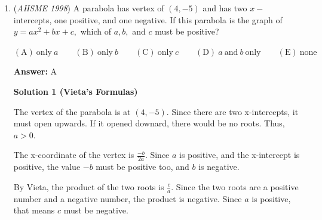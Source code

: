 \begin{enumerate}
 $\mathrm{(A) \ }14 \qquad \mathrm{(B) \ }15 \qquad \mathrm{(C) \ }16 \qquad \mathrm{(D) \ }17 \qquad \mathrm{(E) \ }18$

 \textbf{Answer: }E



\textbf{Solution}

We have $144 = 2^4 3^2$.

 As the numbers on the dice are less than $9$, the two $3$s must come from different dice. This leaves us with three cases: $(6,6,a,b)$, $(6,3,a,b)$, and $(3,3,a,b)$.

 In the first case we have $ab=2^2$, leading to the solutions $(6,6,4,1)$ and $(6,6,2,2)$.

 In the second case we have $ab=2^3$, leading to the only solution $(6,3,4,2)$.

 In the third case we have $ab=2^4$, leading to the only solution $(3,3,4,4)$.

 We found all four possibilities for the numbers on the upper faces of the dice. The sums of these numbers are $17$, $16$, $15$, and $14$.Therefore the answer is $\mathrm{(E)}$.

 


	\item (\textit{AHSME 1998}) A parabola has vertex of $(4,-5)$ and has two $x-$intercepts, one positive, and one negative. If this parabola is the graph of $y = ax^2 + bx + c,$ which of $a,b,$ and $c$ must be positive?


 $\mathrm{(A) \ } \text{only}\ a \qquad \mathrm{(B) \ } \text{only}\ b \qquad \mathrm{(C) \ } \text{only}\ c \qquad \mathrm{(D) \ } a\ \text{and}\ b\ \text{only} \qquad \mathrm{(E) \ } \text{none}$

 \textbf{Answer: }A



\textbf{Solution 1 (Vieta's Formulas)}

The vertex of the parabola is at $(4,-5)$.  Since there are two x-intercepts, it must open upwards.  If it opened downard, there would be no roots.  Thus, $a > 0$.

 The x-coordinate of the vertex is $\frac{-b}{2a}$.  Since $a$ is positive, and the x-intercept is positive, the value $-b$ must be positive too, and $b$ is negative.

 By Vieta, the product of the two roots is $\frac{c}{a}$.  Since the two roots are a positive number and a negative number, the product is negative.  Since $a$ is positive, that means $c$ must be negative.


\end{enumerate}
